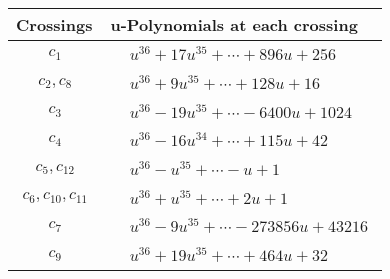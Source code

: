 \documentclass[1p]{elsarticle_modified}
\theoremstyle{definition}
\begin{document}
\begin{tabular}{m{50pt}|m{274pt}}
Crossings & \hspace{64pt}u-Polynomials at each crossing \\
\hline $$\begin{aligned}c_{1}\end{aligned}$$&$\begin{aligned}
&u^{36}+17 u^{35}+\cdots+896 u+256
\end{aligned}$\\
\hline $$\begin{aligned}c_{2},c_{8}\end{aligned}$$&$\begin{aligned}
&u^{36}+9 u^{35}+\cdots+128 u+16
\end{aligned}$\\
\hline $$\begin{aligned}c_{3}\end{aligned}$$&$\begin{aligned}
&u^{36}-19 u^{35}+\cdots-6400 u+1024
\end{aligned}$\\
\hline $$\begin{aligned}c_{4}\end{aligned}$$&$\begin{aligned}
&u^{36}-16 u^{34}+\cdots+115 u+42
\end{aligned}$\\
\hline $$\begin{aligned}c_{5},c_{12}\end{aligned}$$&$\begin{aligned}
&u^{36}- u^{35}+\cdots- u+1
\end{aligned}$\\
\hline $$\begin{aligned}c_{6},c_{10},c_{11}\end{aligned}$$&$\begin{aligned}
&u^{36}+u^{35}+\cdots+2 u+1
\end{aligned}$\\
\hline $$\begin{aligned}c_{7}\end{aligned}$$&$\begin{aligned}
&u^{36}-9 u^{35}+\cdots-273856 u+43216
\end{aligned}$\\
\hline $$\begin{aligned}c_{9}\end{aligned}$$&$\begin{aligned}
&u^{36}+19 u^{35}+\cdots+464 u+32
\end{aligned}$\\
\hline
\end{tabular}\\~\\
\end{document}
